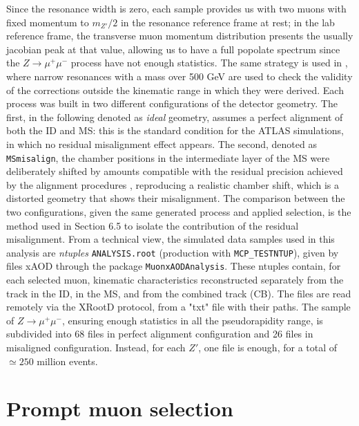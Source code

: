 \documentclass[11pt,a4paper,twoside,openright]{report}
\begin{document}
\noindent Since the resonance width is zero, each sample provides us with two muons with fixed momentum to \(m_{Z'}/2\) in the resonance reference frame at rest; in the lab reference frame, the transverse muon momentum distribution presents the usually jacobian peak at that value, allowing us to have a full popolate spectrum since the \(Z\rightarrow\mu^+\mu^-\) process have not enough statistics. The same strategy is used in \cite{ATLAS-MCP-2023}, where narrow resonances with a mass over 500 GeV are used to check the validity of the corrections outside the kinematic range in which they were derived. Each process was built in two different configurations of the detector geometry. The first, in the following denoted as \emph{ideal} geometry, assumes a perfect alignment of both the ID and MS: this is the standard condition for the ATLAS simulations, in which no residual misalignment effect appears. The second, denoted as \texttt{MSmisalign}, the chamber positions in the intermediate layer of the MS were deliberately shifted by amounts compatible with the residual precision achieved by the alignment procedures \cite{ATLAS-MCP-2023}, reproducing a realistic chamber shift, which is a distorted geometry that shows their misalignment. The comparison between the two configurations, given the same generated process and applied selection, is the method used in Section 6.5 to isolate the contribution of the residual misalignment. From a technical view, the simulated data samples used in this analysis are \emph{ntuples} \texttt{ANALYSIS.root} (production with \texttt{MCP\_TESTNTUP}), given by files xAOD through the package \texttt{MuonxAODAnalysis}. These ntuples contain, for each selected muon, kinematic characteristics reconstructed separately from the track in the ID, in the MS, and from the combined track (CB). The files are read remotely via the XRootD protocol, from a "txt" file with their paths. The sample of $Z\rightarrow\mu^+\mu^-$, ensuring enough statistics in all the pseudorapidity range, is subdivided into 68 files in perfect alignment configuration and 26 files in misaligned configuration. Instead, for each \(Z'\), one file is enough, for a total of \(\simeq 250 \) million events. 

\section{Prompt muon selection}
\end{document}
